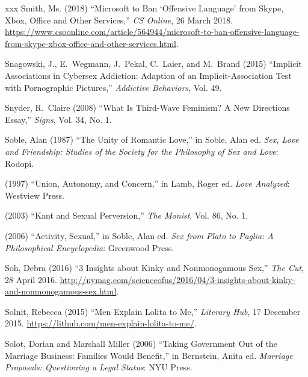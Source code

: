 \documentclass[]{jlreq} \usepackage{mystyle}
\begin{document}
\begin{thebibliography}{xxx}
Smith, Ms. (2018) ``Microsoft to Ban `Offensive Language' from Skype, Xbox,
  Office and Other Services,'' \emph{CS Online}, 26 March 2018.
  \url{https://www.csoonline.com/article/564944/microsoft-to-ban-offensive-language-from-skype-xbox-office-and-other-services.html}.

Snagowski, J., E.~Wegmann, J.~Pekal, C.~Laier, and M.~Brand (2015) ``Implicit
  Associations in Cybersex Addiction: Adaption of an Implicit-Association Test
  with Pornographic Pictures,'' \textit{ Addictive Behaviors}, Vol. 49.

Snyder, R.~Claire (2008) ``What Is Third-Wave Feminism? A New Directions
  Essay,'' \textit{ Signs}, Vol. 34, No. 1.

Soble, Alan (1987) ``The Unity of Romantic Love,'' in Soble, Alan ed.
  \textit{ Sex, Love and Friendship: Studies of the Society for the Philosophy
  of Sex and Love}: Rodopi.

 \bysame{}  (1997) ``Union, Autonomy, and Concern,'' in Lamb, Roger ed.
  \textit{ Love Analyzed}: Westview Press.

 \bysame{}  (2003) ``Kant and Sexual Perversion,'' \textit{ The Monist}, Vol.
  86, No. 1.

 \bysame{}  (2006) ``Activity, Sexual,'' in Soble, Alan ed.   \textit{ Sex from
  Plato to Paglia: A Philosophical Encyclopedia}: Greenwood Press.

Soh, Debra (2016) ``3 Insights about Kinky and Nonmonogamous Sex,'' \emph{The
  Cut}, 28 April 2016.
  \url{http://nymag.com/scienceofus/2016/04/3-insights-about-kinky-and-nonmonogamous-sex.html}.

Solnit, Rebecca (2015) ``Men Explain Lolita to Me,'' \emph{Literary Hub}, 17
  December 2015. \url{https://lithub.com/men-explain-lolita-to-me/}.

Solot, Dorian and Marshall Miller (2006) ``Taking Government Out of the
  Marriage Business: Families Would Benefit,'' in Bernstein, Anita ed.
  \textit{ Marriage Proposals: Questioning a Legal Status}: NYU Press.


\end{thebibliography}
\end{document}
